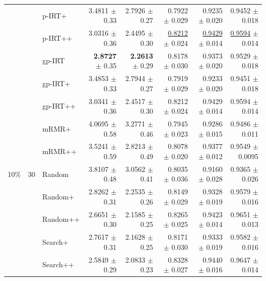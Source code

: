 \begin{longtable}{llp{}rrrrr}
 &  & p-IRT+ & 3.4811 {\scriptsize $\pm$ 0.33} & 2.7926 {\scriptsize $\pm$ 0.27} & 0.7922 {\scriptsize $\pm$ 0.029} & 0.9235 {\scriptsize $\pm$ 0.020} & 0.9452 {\scriptsize $\pm$ 0.018} \\
 &  & p-IRT++ & 3.0316 {\scriptsize $\pm$ 0.36} & 2.4495 {\scriptsize $\pm$ 0.30} & \underline{0.8212} {\scriptsize $\pm$ 0.024} & \underline{0.9429} {\scriptsize $\pm$ 0.014} & \underline{0.9594} {\scriptsize $\pm$ 0.014} \\
 &  & gp-IRT & \textbf{2.8727} {\scriptsize $\pm$ 0.35} & \textbf{2.2613} {\scriptsize $\pm$ 0.29} & 0.8178 {\scriptsize $\pm$ 0.030} & 0.9373 {\scriptsize $\pm$ 0.020} & 0.9529 {\scriptsize $\pm$ 0.018} \\
 &  & gp-IRT+ & 3.4853 {\scriptsize $\pm$ 0.33} & 2.7944 {\scriptsize $\pm$ 0.27} & 0.7919 {\scriptsize $\pm$ 0.029} & 0.9233 {\scriptsize $\pm$ 0.020} & 0.9451 {\scriptsize $\pm$ 0.018} \\
 &  & gp-IRT++ & 3.0341 {\scriptsize $\pm$ 0.36} & 2.4517 {\scriptsize $\pm$ 0.30} & 0.8212 {\scriptsize $\pm$ 0.024} & 0.9429 {\scriptsize $\pm$ 0.014} & 0.9594 {\scriptsize $\pm$ 0.014} \\
 &  & mRMR+ & 4.0695 {\scriptsize $\pm$ 0.58} & 3.2771 {\scriptsize $\pm$ 0.46} & 0.7945 {\scriptsize $\pm$ 0.023} & 0.9286 {\scriptsize $\pm$ 0.015} & 0.9486 {\scriptsize $\pm$ 0.011} \\
 &  & mRMR++ & 3.5241 {\scriptsize $\pm$ 0.59} & 2.8213 {\scriptsize $\pm$ 0.49} & 0.8078 {\scriptsize $\pm$ 0.020} & 0.9377 {\scriptsize $\pm$ 0.012} & 0.9549 {\scriptsize $\pm$ 0.0095} \\
\midrule
10\% & 30 & Random & 3.8107 {\scriptsize $\pm$ 0.48} & 3.0562 {\scriptsize $\pm$ 0.41} & 0.8035 {\scriptsize $\pm$ 0.036} & 0.9160 {\scriptsize $\pm$ 0.028} & 0.9365 {\scriptsize $\pm$ 0.026} \\
 &  & Random+ & 2.8262 {\scriptsize $\pm$ 0.31} & 2.2535 {\scriptsize $\pm$ 0.26} & 0.8149 {\scriptsize $\pm$ 0.029} & 0.9328 {\scriptsize $\pm$ 0.019} & 0.9579 {\scriptsize $\pm$ 0.016} \\
 &  & Random++ & 2.6651 {\scriptsize $\pm$ 0.30} & 2.1585 {\scriptsize $\pm$ 0.25} & 0.8265 {\scriptsize $\pm$ 0.025} & 0.9423 {\scriptsize $\pm$ 0.014} & 0.9651 {\scriptsize $\pm$ 0.013} \\
 &  & Search+ & 2.7617 {\scriptsize $\pm$ 0.31} & 2.1628 {\scriptsize $\pm$ 0.25} & 0.8171 {\scriptsize $\pm$ 0.030} & 0.9333 {\scriptsize $\pm$ 0.019} & 0.9582 {\scriptsize $\pm$ 0.016} \\
 &  & Search++ & 2.5849 {\scriptsize $\pm$ 0.29} & 2.0833 {\scriptsize $\pm$ 0.23} & 0.8328 {\scriptsize $\pm$ 0.027} & 0.9440 {\scriptsize $\pm$ 0.016} & 0.9647 {\scriptsize $\pm$ 0.014} \\

\end{longtable}
